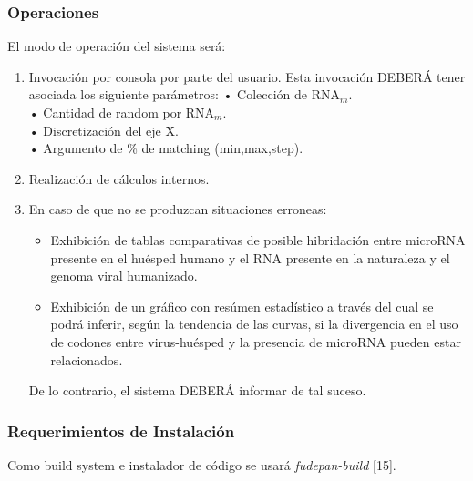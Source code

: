 \documentclass[12pt,a4paper,spanish]{article}
\begin{document}
	\subsubsection{Operaciones}
		El modo de operación del sistema será: 
		\begin{enumerate}
			\item Invocación por consola por parte del usuario. Esta invocación DEBERÁ tener asociada los siguiente parámetros: 
					\vskip 0.25cm
					\hspace*{0.75cm} • Colección de RNA$_m$. \\
					\hspace*{0.75cm} •  Cantidad de random por RNA$_m$. \\
					\hspace*{0.75cm} •  Discretización del eje X. \\
					\hspace*{0.75cm} •  Argumento de \% de matching (min,max,step). 	
			\item Realización de cálculos internos.
			\item En caso de que no se produzcan situaciones erroneas: 
				\begin{itemize}
					\item Exhibición de tablas comparativas de posible hibridación entre microRNA presente en el huésped humano y el RNA presente en la 						  naturaleza y el genoma viral humanizado. %
					\item Exhibición de un gráfico con resúmen estadístico a través del cual se podrá inferir, según la tendencia de las curvas, si la 							  divergencia en el uso de codones entre virus-huésped y la presencia de microRNA pueden estar relacionados.
				\end{itemize}
				De lo contrario, el sistema DEBERÁ informar de tal suceso.
		\end{enumerate}

	\subsubsection{Requerimientos de Instalación}
		Como build system e instalador de código se usará \textit{fudepan-build} [15].
\end{document}
